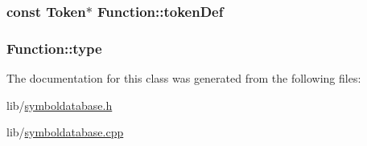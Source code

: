 \hypertarget{class_function_ad3b10c81ba3539978da1a77a3ac12f12}{
\subsubsection[{token\-Def}]{\setlength{\rightskip}{0pt plus 5cm}const {\bf Token}$\ast$ Function\-::token\-Def}}\label{class_function_ad3b10c81ba3539978da1a77a3ac12f12}
\hypertarget{class_function_a4f098039aa353ddb8c0544945a248dbf}{
\subsubsection[{type}]{ Function\-::type}}\label{class_function_a4f098039aa353ddb8c0544945a248dbf}


The documentation for this class was generated from the following files\-:\begin{DoxyCompactItemize}
\item 
lib/\hyperlink{symboldatabase_8h}{symboldatabase.\-h}\item 
lib/\hyperlink{symboldatabase_8cpp}{symboldatabase.\-cpp}\end{DoxyCompactItemize}
